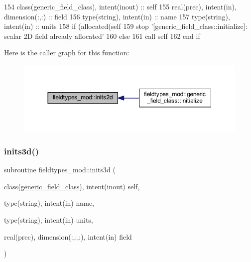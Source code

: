 \begin{DoxyCode}
154     \textcolor{keywordtype}{class}(generic\_field\_class), \textcolor{keywordtype}{intent(inout)} :: self
155     \textcolor{keywordtype}{real(prec)}, \textcolor{keywordtype}{intent(in)}, \textcolor{keywordtype}{dimension(:,:)} :: field
156     \textcolor{keywordtype}{type}(string), \textcolor{keywordtype}{intent(in)} :: name
157     \textcolor{keywordtype}{type}(string), \textcolor{keywordtype}{intent(in)} :: units
158     \textcolor{keywordflow}{if} (\textcolor{keyword}{allocated}(self%
159         stop \textcolor{stringliteral}{'[generic\_field\_class::initialize]: scalar 2D field already allocated'}
160     \textcolor{keywordflow}{else}
161         \textcolor{keyword}{call }self%
162 \textcolor{keywordflow}{    end if}
\end{DoxyCode}
Here is the caller graph for this function\+:\nopagebreak
\begin{figure}[H]
\begin{center}
\leavevmode
\includegraphics[width=350pt]{namespacefieldtypes__mod_ad3329e97ec60bf9226d19be45ed21859_icgraph}
\end{center}
\end{figure}
\mbox{\label{namespacefieldtypes__mod_a750ce2c729d98ea7031c839a3a5ebd7c}} 
\subsubsection{\texorpdfstring{inits3d()}{inits3d()}}
{\footnotesize\ttfamily subroutine fieldtypes\+\_\+mod\+::inits3d (\begin{DoxyParamCaption}\item[{class(\mbox{\hyperlink{structfieldtypes__mod_1_1generic__field__class}{generic\+\_\+field\+\_\+class}}), intent(inout)}]{self,  }\item[{type(string), intent(in)}]{name,  }\item[{type(string), intent(in)}]{units,  }\item[{real(prec), dimension(\+:,\+:,\+:), intent(in)}]{field }\end{DoxyParamCaption})\hspace{0.3cm}{\ttfamily [private]}}



